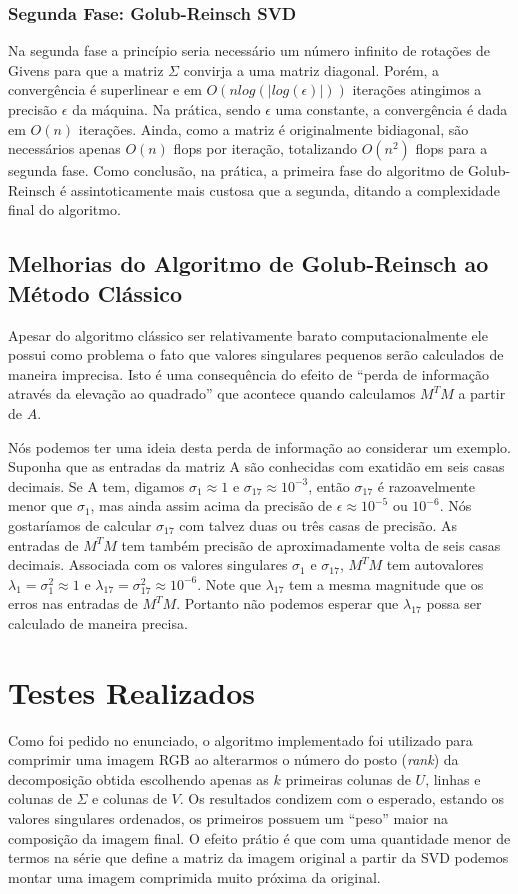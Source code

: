 \documentclass[brazil,times]{abnt}
\begin{document}
		\subsection{Segunda Fase: Golub-Reinsch SVD}
			Na segunda fase a princípio seria necessário um número infinito de rotações de Givens para que a matriz $\Sigma$ convirja a uma matriz diagonal. Porém, a convergência é superlinear e em $O(n log(|log(\epsilon)|))$ iterações atingimos a precisão $\epsilon$ da máquina. Na prática, sendo $\epsilon$ uma constante, a convergência é dada em $O(n)$ iterações. Ainda, como a matriz é originalmente bidiagonal, são necessários apenas $O(n)$ flops por iteração, totalizando $O(n^2)$ flops para a segunda fase. Como conclusão, na prática, a primeira fase do algoritmo de Golub-Reinsch é assintoticamente mais custosa que a segunda, ditando a complexidade final do algoritmo. \cite{trefethen}
			

	\section{Melhorias do Algoritmo de Golub-Reinsch ao Método Clássico\label{melhorias}}
		Apesar do algoritmo clássico ser relativamente barato computacionalmente ele possui como problema o fato que valores singulares pequenos serão calculados de maneira imprecisa. Isto é uma consequência do efeito de ``perda de informação através da elevação ao quadrado'' que acontece quando calculamos $M^{T}M$ a partir de $A$.
		
		Nós podemos ter uma ideia desta perda de informação ao considerar um exemplo. Suponha que as entradas da matriz A são conhecidas com exatidão em seis casas decimais. Se A tem, digamos $\sigma_1 \approx 1$ e $\sigma_{17} \approx 10^{-3}$, então $\sigma_{17}$ é razoavelmente menor que $\sigma_1$, mas ainda assim acima da precisão de $\epsilon \approx 10^{-5}$ ou $10^{-6}$. Nós gostaríamos de calcular $\sigma_{17}$ com talvez duas ou três casas de precisão. As entradas de $M^{T}M$ tem também precisão de aproximadamente volta de seis casas decimais. Associada com os valores singulares $\sigma_1$ e $\sigma_{17}$, $M^{T}M$ tem autovalores $\lambda_1 = \sigma_{1}^{2} \approx 1$ e $\lambda_{17} = \sigma_{17}^{2} \approx 10^{-6}$. Note que $\lambda_{17}$ tem a mesma magnitude que os erros nas entradas de $M^{T}M$. Portanto não podemos esperar que $\lambda_{17}$ possa ser calculado de maneira precisa. \cite{watkins2004fundamentals}
	
	
\chapter{Testes Realizados}
	Como foi pedido no enunciado, o algoritmo implementado foi utilizado para comprimir uma imagem RGB ao alterarmos o número do posto (\emph{rank}) da decomposição obtida escolhendo apenas as $k$ primeiras colunas de $U$, linhas e colunas de $\Sigma$ e colunas de $V$. Os resultados condizem com o esperado, estando os valores singulares ordenados, os primeiros possuem um ``peso'' maior na composição da imagem final. O efeito prátio é que com uma quantidade menor de termos na série que define a matriz da imagem original a partir da SVD podemos montar uma imagem comprimida muito próxima da original.
	
\end{document}
